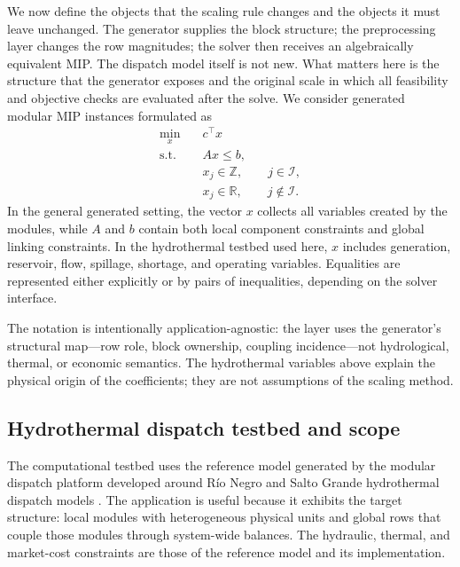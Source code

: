 \documentclass[AMA,Times1COL]{WileyNJDv5} %
\newcommand{\R}{\mathbb{R}}
\newcommand{\Z}{\mathbb{Z}}
\providecommand{\DIFadd}[1]{{\protect\color{blue} \sf #1}} %
\providecommand{\DIFdel}[1]{{\protect\color{red} \scriptsize #1}} %
\providecommand{\DIFaddbegin}{} %
\providecommand{\DIFaddend}{} %
\providecommand{\DIFdelbegin}{} %
\providecommand{\DIFdelend}{} %
\begin{document}
We now define the objects that the scaling rule changes and the objects it must leave
unchanged. The generator supplies the block structure; the preprocessing layer changes the
row magnitudes; the solver then receives an algebraically equivalent MIP. The dispatch
model itself is not new. What matters here is the structure that the generator exposes and
the original scale in which all feasibility and objective checks are evaluated after the
solve. We consider generated modular MIP instances formulated as
\begin{equation}
\begin{aligned}
  \min_{x} \quad & c^\top x \\
  \text{s.t.} \quad & Ax \le b, \\
  & x_j \in \Z, \qquad j \in \mathcal{I}, \\
  & x_j \in \R, \qquad j \notin \mathcal{I}.
\end{aligned}
\label{eq:generic-mip}
\end{equation}
In the general generated setting, the vector $x$ collects all variables created by the
modules, while $A$ and $b$ contain both local component constraints and global linking
constraints. In the hydrothermal testbed used here, $x$ includes generation, reservoir,
flow, spillage, shortage, and operating variables. Equalities are represented either
explicitly or by pairs of inequalities, depending on the solver interface.

\DIFaddbegin \DIFadd{The notation is intentionally application-agnostic: the layer uses the generator's structural
map---row role, block ownership, coupling incidence---not hydrological, thermal, or economic
semantics. The hydrothermal variables above explain the physical origin of the coefficients;
they are not assumptions of the scaling method.
}

\DIFaddend \subsection{Hydrothermal dispatch testbed and scope}

The computational testbed uses the reference model generated by the modular dispatch
platform developed around R\'io Negro and Salto Grande hydrothermal dispatch models
\DIFdelbegin \DIFdel{\citep{risso2025rioNegro,risso2025uruguayRiver,risso2026enriched,rodriguez2025thesis}}\DIFdelend \DIFaddbegin \DIFadd{\cite{risso2025rioNegro,risso2025uruguayRiver,rodriguez2025thesis}}\DIFaddend .
The application is useful because it exhibits the target structure: local modules
with heterogeneous physical units and global rows that couple those modules through
system-wide balances. The hydraulic, thermal, and market-cost constraints are those of
the reference model and its implementation.
\end{document}
